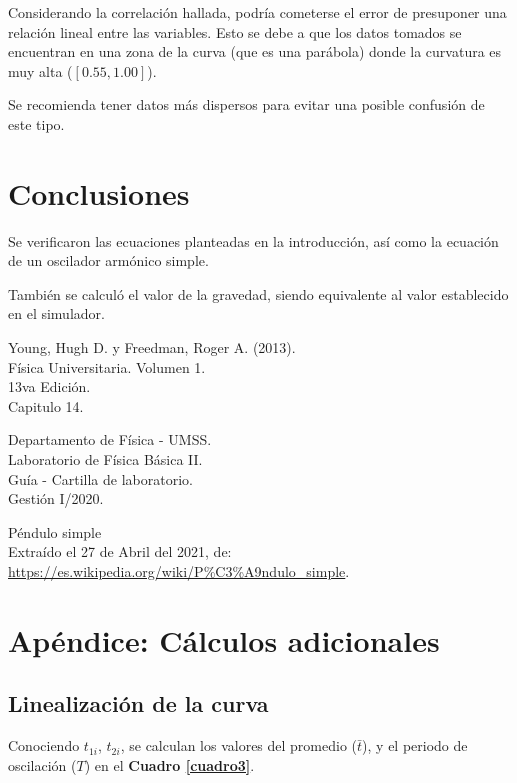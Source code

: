 \documentclass[letter,11pt]{article}
\begin{document}
Considerando la correlación hallada, podría cometerse el error de presuponer una
relación lineal entre las variables. Esto se debe a que los datos tomados se
encuentran en una zona de la curva (que es una parábola) donde la curvatura es
muy alta ($[0.55, 1.00]$).

Se recomienda tener datos más dispersos para evitar una posible confusión de
este tipo.

\section{Conclusiones}

Se verificaron las ecuaciones planteadas en la introducción, así como la
ecuación de un oscilador armónico simple.

También se calculó el valor de la gravedad, siendo equivalente al valor
establecido en el simulador.

\begin{thebibliography}{99}

 Young, Hugh D. y Freedman, Roger A. (2013).\\
Física Universitaria. Volumen 1.\\
13va Edición.\\
Capitulo 14.

 Departamento de Física - UMSS.\\
Laboratorio de Física Básica II.\\
Guía - Cartilla de laboratorio.\\
Gestión I/2020.

 Péndulo simple \\
Extraído el 27 de Abril del 2021, de: \\
\url{https://es.wikipedia.org/wiki/P%C3%A9ndulo_simple}.

\end{thebibliography}

\newpage
\section*{Apéndice: Cálculos adicionales}

\subsection{Linealización de la curva}

Conociendo $t_{1i}$, $t_{2i}$, se calculan los valores del promedio ($\bar{t}$),
y el periodo de oscilación ($T$) en el \textbf{Cuadro \ref{cuadro3}}.
\end{document}
